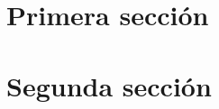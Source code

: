 \documentclass[12pt, a4paper]{article}
\begin{document}


\tableofcontents
\newpage


\section{Primera sección}




\section{Segunda sección}



\newpage

\end{document}
